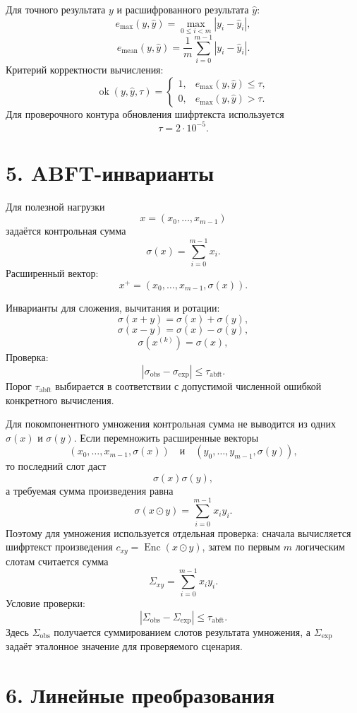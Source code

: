\documentclass[12pt]{article}
\newcommand{\Enc}{\operatorname{Enc}}
\begin{document}
Для точного результата \(y\) и расшифрованного результата \(\hat{y}\):
\[
    e_{\max}(y,\hat{y})
    =
    \max_{0\leq i<m}|y_i-\hat{y}_i|,
\]
\[
    e_{\operatorname{mean}}(y,\hat{y})
    =
    \frac{1}{m}\sum_{i=0}^{m-1}|y_i-\hat{y}_i|.
\]
Критерий корректности вычисления:
\[
    \operatorname{ok}(y,\hat{y},\tau)=
    \begin{cases}
        1,& e_{\max}(y,\hat{y})\leq\tau,\\
        0,& e_{\max}(y,\hat{y})>\tau.
    \end{cases}
\]
Для проверочного контура обновления шифртекста используется
\[
    \tau=2\cdot 10^{-5}.
\]

\section*{5. ABFT-инварианты}

Для полезной нагрузки
\[
    x=(x_0,\ldots,x_{m-1})
\]
задаётся контрольная сумма
\[
    \sigma(x)=\sum_{i=0}^{m-1}x_i.
\]
Расширенный вектор:
\[
    x^+=(x_0,\ldots,x_{m-1},\sigma(x)).
\]

Инварианты для сложения, вычитания и ротации:
\[
    \sigma(x+y)=\sigma(x)+\sigma(y),
\]
\[
    \sigma(x-y)=\sigma(x)-\sigma(y),
\]
\[
    \sigma(x^{(k)})=\sigma(x),
\]
Проверка:
\[
    |\sigma_{\operatorname{obs}}-\sigma_{\operatorname{exp}}|
    \leq
    \tau_{\operatorname{abft}}.
\]
Порог \(\tau_{\operatorname{abft}}\) выбирается в соответствии с допустимой
численной ошибкой конкретного вычисления.

Для покомпонентного умножения контрольная сумма не выводится из одних
\(\sigma(x)\) и \(\sigma(y)\). Если перемножить расширенные векторы
\[
    (x_0,\ldots,x_{m-1},\sigma(x))
    \quad\text{и}\quad
    (y_0,\ldots,y_{m-1},\sigma(y)),
\]
то последний слот даст
\[
    \sigma(x)\sigma(y),
\]
а требуемая сумма произведения равна
\[
    \sigma(x\odot y)=\sum_{i=0}^{m-1}x_iy_i.
\]
Поэтому для умножения используется отдельная проверка: сначала вычисляется
шифртекст произведения \(c_{xy}=\Enc(x\odot y)\), затем по первым \(m\)
логическим слотам считается сумма
\[
    \Sigma_{xy}=\sum_{i=0}^{m-1}x_iy_i.
\]
Условие проверки:
\[
    |\Sigma_{\operatorname{obs}}-\Sigma_{\operatorname{exp}}|
    \leq
    \tau_{\operatorname{abft}}.
\]
Здесь \(\Sigma_{\operatorname{obs}}\) получается суммированием слотов
результата умножения, а \(\Sigma_{\operatorname{exp}}\) задаёт эталонное
значение для проверяемого сценария.

\section*{6. Линейные преобразования}
\end{document}
